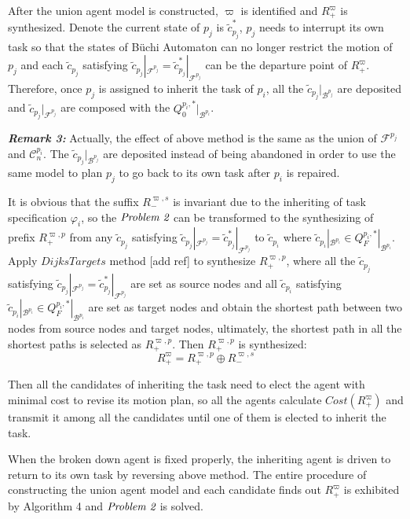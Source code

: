 \documentclass[journal]{IEEEtran}
\begin{document}
After the union agent model is constructed, $\varpi$ is identified and $R^{\varpi}_+$ is synthesized. Denote the current state of $p_j$ is $\tilde{c}_{p_j}^{\ast}$, $p_j$ needs to interrupt its own task so that the states of B\"{u}chi Automaton can no longer restrict the motion of $p_j$ and each $\tilde{c}_{p_j}$ satisfying $\tilde{c}_{p_j}|_{\mathcal{F}^{p_j}}=\tilde{c}_{p_j}^{\ast}|_{\mathcal{F}^{p_j}}$ can be the departure point of $R^{\varpi}_+$. Therefore, once $p_j$ is assigned to inherit the task of $p_i$, all the $\tilde{c}_{p_j}|_{\mathcal{B}^{p_j}}$ are deposited and $\tilde{c}_{p_j}|_{\mathcal{F}^{p_j}}$ are composed with the $Q^{p_i,\ast}_0|_{\mathcal{B}^{p_i}}$.

\textbf{\emph{Remark 3:}} Actually, the effect of above method is the same as the union of $\mathcal{F}^{p_j}$ and $\mathcal{C}^{p_i}_n$. The $\tilde{c}_{p_j}|_{\mathcal{B}^{p_j}}$ are deposited instead of being abandoned in order to use the same model to plan $p_j$ to go back to its own task after $p_i$ is repaired.

It is obvious that the suffix $R^{\varpi,s}_-$ is invariant due to the inheriting of task specification $\varphi_i$, so the $\emph{Problem 2}$ can be transformed to the synthesizing of prefix $R^{\varpi,p}_+$ from any $\tilde{c}_{p_j}$ satisfying  $\tilde{c}_{p_j}|_{\mathcal{F}^{p_j}}=\tilde{c}_{p_j}^{\ast}|_{\mathcal{F}^{p_j}}$ to $\tilde{c}_{p_i}$ where $\tilde{c}_{p_i}|_{\mathcal{B}^{p_i}}\in Q^{p_i,\ast}_F|_{\mathcal{B}^{p_i}}$. Apply $DijksTargets$ method [add ref] to synthesize $R^{\varpi,p}_+$, where all the $\tilde{c}_{p_j}$ satisfying  $\tilde{c}_{p_j}|_{\mathcal{F}^{p_j}}=\tilde{c}_{p_j}^{\ast}|_{\mathcal{F}^{p_j}}$ are set as source nodes and all $\tilde{c}_{p_i}$ satisfying $\tilde{c}_{p_i}|_{\mathcal{B}^{p_i}}\in Q^{p_i,\ast}_F|_{\mathcal{B}^{p_i}}$ are set as target nodes and obtain the shortest path between two nodes from source nodes and target nodes, ultimately, the shortest path in all the shortest paths is selected as $R^{\varpi,p}_+$. Then $R^{\varpi,p}_+$ is synthesized:
$$R^{\varpi}_+ = R^{\varpi,p}_+\oplus R^{\varpi,s}_-$$

Then all the candidates of inheriting the task need to elect the agent with minimal cost to revise its motion plan, so all the agents calculate $Cost(R^{\varpi}_+)$ and transmit it among all the candidates until one of them is elected to inherit the task.\par
When the broken down agent is fixed properly, the inheriting agent is driven to return to its own task by reversing above method. The entire procedure of constructing the union agent model and each candidate finds out $R^{\varpi}_+$ is exhibited by Algorithm 4 and $\emph{Problem 2}$ is solved.
\end{document}
